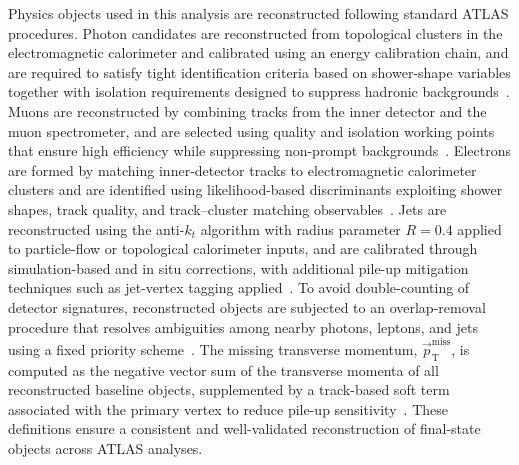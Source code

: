 Physics objects used in this analysis are reconstructed following standard ATLAS procedures. Photon candidates are reconstructed from topological clusters in the electromagnetic calorimeter and calibrated using an energy calibration chain, and are required to satisfy tight identification criteria based on shower-shape variables together with isolation requirements designed to suppress hadronic backgrounds~\cite{ATLASPhotonPerf}. Muons are reconstructed by combining tracks from the inner detector and the muon spectrometer, and are selected using quality and isolation working points that ensure high efficiency while suppressing non-prompt backgrounds~\cite{ATLASMuonPerf}. Electrons are formed by matching inner-detector tracks to electromagnetic calorimeter clusters and are identified using likelihood-based discriminants exploiting shower shapes, track quality, and track–cluster matching observables~\cite{ATLASElectronPerf}. Jets are reconstructed using the anti-$k_t$ algorithm with radius parameter $R=0.4$ applied to particle-flow or topological calorimeter inputs, and are calibrated through simulation-based and in situ corrections, with additional pile-up mitigation techniques such as jet-vertex tagging applied~\cite{ATLASJetPerf}. To avoid double-counting of detector signatures, reconstructed objects are subjected to an overlap-removal procedure that resolves ambiguities among nearby photons, leptons, and jets using a fixed priority scheme~\cite{ATLASObjDef}. The missing transverse momentum, $\vec{p}_{\mathrm{T}}^{\mathrm{miss}}$, is computed as the negative vector sum of the transverse momenta of all reconstructed baseline objects, supplemented by a track-based soft term associated with the primary vertex to reduce pile-up sensitivity~\cite{ATLASMETPerf}. These definitions ensure a consistent and well-validated reconstruction of final-state objects across ATLAS analyses.


